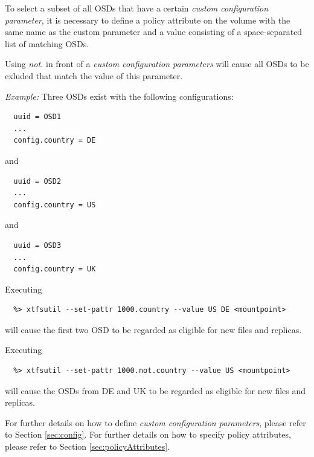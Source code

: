 \documentclass[a4paper,10pt]{book}
\begin{document}
To select a subset of all OSDs that have a certain \emph{custom configuration parameter}, it is necessary to define a policy attribute on the volume with the same name as the custom parameter and a value consisting of a space-separated list of matching OSDs.

Using \emph{not.} in front of a \emph{custom configuration parameters} will cause all OSDs to be exluded that match the value of this parameter.

\vspace{0.5cm}
\emph{Example:} Three OSDs exist with the following configurations:

  \begin{verbatim}
  uuid = OSD1
  ...
  config.country = DE\end{verbatim}

and

  \begin{verbatim}
  uuid = OSD2
  ...
  config.country = US\end{verbatim}

and 

  \begin{verbatim}
  uuid = OSD3
  ...
  config.country = UK\end{verbatim}

Executing

  \begin{verbatim}
  %> xtfsutil --set-pattr 1000.country --value US DE <mountpoint>
  \end{verbatim}

will cause the first two OSD to be regarded as eligible for new files and replicas. 

\vspace{0.5cm}

Executing

  \begin{verbatim}
  %> xtfsutil --set-pattr 1000.not.country --value US <mountpoint>
  \end{verbatim}

will cause the OSDs from DE and UK to be regarded as eligible for new files and replicas. 

\vspace{0.5cm}

For further details on how to define \emph{custom configuration parameters}, please refer to Section \ref{sec:config}. For further details on how to specify policy attributes, please refer to Section \ref{sec:policyAttributes}.
\end{document}
